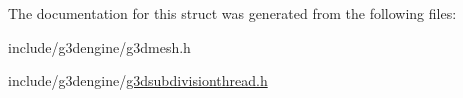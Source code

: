 The documentation for this struct was generated from the following files\+:\begin{DoxyCompactItemize}
\item 
include/g3dengine/g3dmesh.\+h\item 
include/g3dengine/\hyperlink{g3dsubdivisionthread_8h}{g3dsubdivisionthread.\+h}\end{DoxyCompactItemize}
